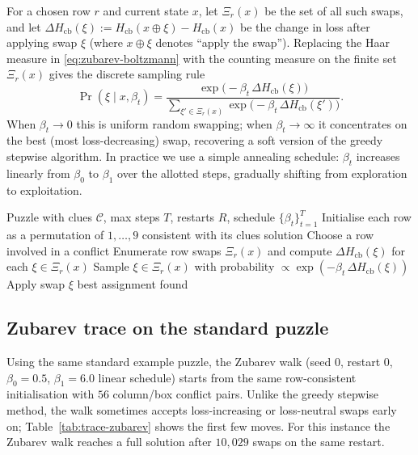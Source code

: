 \documentclass[11pt]{article}
\begin{document}
For a chosen row $r$ and current state $x$, let $\Xi_r(x)$ be the set of all such swaps, and let \(\Delta H_{\mathrm{cb}}(\xi) := H_{\mathrm{cb}}(x\oplus\xi)-H_{\mathrm{cb}}(x)\) be the change in loss after applying swap \(\xi\) (where \(x\oplus\xi\) denotes ``apply the swap''). Replacing the Haar measure in \eqref{eq:zubarev-boltzmann} with the counting measure on the finite set $\Xi_r(x)$ gives the discrete sampling rule
\begin{equation}
\Pr(\xi \mid x,\beta_t) = \frac{\exp\!\bigl(-\beta_t\,\Delta H_{\mathrm{cb}}(\xi)\bigr)}{\sum_{\xi'\in\Xi_r(x)} \exp\!\bigl(-\beta_t\,\Delta H_{\mathrm{cb}}(\xi')\bigr)}.
\label{eq:zubarev-discrete}
\end{equation}
When $\beta_t\to 0$ this is uniform random swapping; when $\beta_t\to\infty$ it concentrates on the best (most loss-decreasing) swap, recovering a soft version of the greedy stepwise algorithm. In practice we use a simple annealing schedule: $\beta_t$ increases linearly from $\beta_0$ to $\beta_1$ over the allotted steps, gradually shifting from exploration to exploitation.

\begin{algorithm}[t]
\caption{Zubarev walk over row swaps (heuristic)}
\begin{algorithmic}[1]
\Require Puzzle with clues $\mathcal{C}$, max steps $T$, restarts $R$, schedule $\{\beta_t\}_{t=1}^T$
    \State Initialise each row as a permutation of $1,\dots,9$ consistent with its clues
         \State \Return solution \EndIf
        \State Choose a row involved in a conflict
        \State Enumerate row swaps $\Xi_r(x)$ and compute $\Delta H_{\mathrm{cb}}(\xi)$ for each $\xi\in\Xi_r(x)$
        \State Sample $\xi\in\Xi_r(x)$ with probability $\propto \exp(-\beta_t\,\Delta H_{\mathrm{cb}}(\xi))$
        \State Apply swap $\xi$
    \EndFor
\EndFor
\State \Return best assignment found
\end{algorithmic}
\end{algorithm}

\subsection{Zubarev trace on the standard puzzle}
Using the same standard example puzzle, the Zubarev walk (seed \(0\), restart \(0\), \(\beta_0=0.5\), \(\beta_1=6.0\) linear schedule) starts from the same row-consistent initialisation with \(56\) column/box conflict pairs. Unlike the greedy stepwise method, the walk sometimes accepts loss-increasing or loss-neutral swaps early on; Table~\ref{tab:trace-zubarev} shows the first few moves. For this instance the Zubarev walk reaches a full solution after \(10{,}029\) swaps on the same restart.
\end{document}
